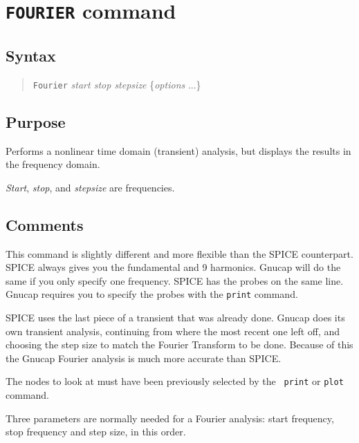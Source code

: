 \section{{\tt FOURIER} command}
\subsection{Syntax}
\begin{verse}
{\tt Fourier} {\it start stop stepsize} \{{\it options} ...\}
\end{verse}
\subsection{Purpose}

Performs a nonlinear time domain (transient) analysis, but displays the
results in the frequency domain.

{\it Start}, {\it stop}, and {\it stepsize} are frequencies.
\subsection{Comments}

This command is slightly different and more flexible than the SPICE
counterpart.  SPICE always gives you the fundamental and 9 harmonics.
Gnucap will do the same if you only specify one frequency.  SPICE has
the probes on the same line.  Gnucap requires you to specify the probes
with the {\tt print} command.  

SPICE uses the last piece of a transient that was already done.  Gnucap
does its own transient analysis, continuing from where the most recent
one left off, and choosing the step size to match the Fourier
Transform to be done.  Because of this the Gnucap Fourier analysis is
much more accurate than SPICE.

The nodes to look at must have been previously selected by the {\tt
print} or {\tt plot} command.

Three parameters are normally needed for a Fourier analysis: start
frequency, stop frequency and step size, in this order.

